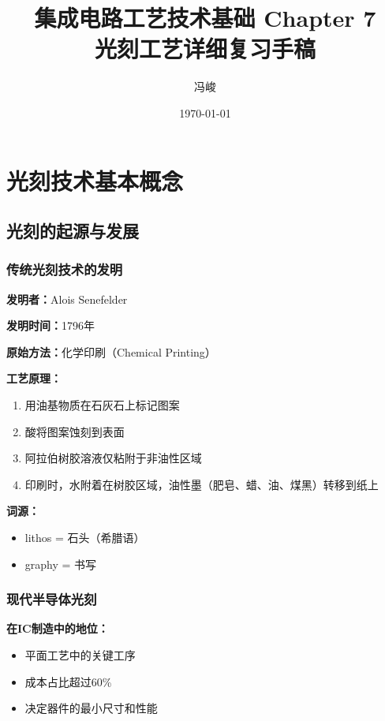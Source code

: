 \documentclass[UTF8,12pt,a4paper]{ctexart}
\title{集成电路工艺技术基础 Chapter 7\\光刻工艺详细复习手稿}
\author{冯峻}
\date{\today}
\begin{document}
\maketitle
\tableofcontents
\newpage

\section{光刻技术基本概念}

\subsection{光刻的起源与发展}

\subsubsection{传统光刻技术的发明}

\textbf{发明者：}Alois Senefelder

\textbf{发明时间：}1796年

\textbf{原始方法：}化学印刷（Chemical Printing）

\textbf{工艺原理：}
\begin{enumerate}
    \item 用油基物质在石灰石上标记图案
    \item 酸将图案蚀刻到表面
    \item 阿拉伯树胶溶液仅粘附于非油性区域
    \item 印刷时，水附着在树胶区域，油性墨（肥皂、蜡、油、煤黑）转移到纸上
\end{enumerate}

\textbf{词源：}
\begin{itemize}
    \item lithos = 石头（希腊语）
    \item graphy = 书写
\end{itemize}

\subsubsection{现代半导体光刻}

\textbf{在IC制造中的地位：}
\begin{itemize}
    \item 平面工艺中的关键工序
    \item 成本占比超过60\%
    \item 决定器件的最小尺寸和性能
\end{itemize}
\end{document}
